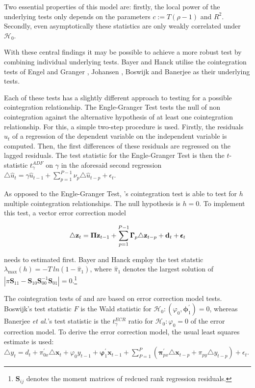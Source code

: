 \documentclass[11pt,a4paper]{article}
\let\rmarkdownfootnote\footnote%
\def\footnote{\protect\rmarkdownfootnote}
\begin{document}
Two essential properties of this model are: firstly, the local power of
the underlying tests only depends on the parameters \(c := T(\rho -1)\)
and \(R^2\). Secondly, even asymptotically these statistics are only
weakly correlated under \(\mathcal{H}_0\). \autocite{gregory_mixed_2004}

With these central findings it may be possible to achieve a more robust
test by combining individual underlying tests. Bayer and Hanck utilise
the cointegration tests of Engel and Granger
\autocite{Englegranger1987}, Johansen \autocite{Johansen1988}, Boswijk
\autocite{Boswijk1994} and Banerjee \autocite{Banerjee1998} as their
underlying tests.

Each of these tests has a slightly different approach to testing for a
possible cointegration relationship. The Engle-Granger Test tests the
null of non cointegration against the alternative hypothesis of at least
one cointegration relationship. For this, a simple two-step procedure is
used. Firstly, the residuals \(\hat{u}_t\) of a regression of the
dependent variable on the independent variable is computed. Then, the
first differences of these residuals are regressed on the lagged
residuals. The test statistic for the Engle-Granger Test is then the
\(t\)-statistic \(t^{ADF}_\gamma\) on \(\gamma\) in the aforesaid second
regression
\(\triangle \hat{u}_t = \gamma \hat{u}_{t-1} + \sum_{p = 1}^{P-1}\nu_p \triangle \hat{u}_{t-p} +\epsilon_t\).
\autocite{Englegranger1987}

As opposed to the Engle-Granger Test, \textcite{Johansen1988}'s
cointegration test is able to test for \(h\) multiple cointegration
relationships. The null hypothesis is \(h = 0\). To implement this test,
a vector error correction model

\begin{align}
\triangle {\bf z}_t = {\bf \Pi z}_{t-1} + \sum^{P-1}_{p=1}\pmb{\Gamma}_p \triangle{\bf z}_{t-p} + {\bf d}_t + \pmb{\epsilon}_t
\end{align}

needs to estimated first. Bayer and Hanck employ the test statstic
\(\lambda_{\max} (h) = - T \ ln(1 - \hat{\pi}_1)\), where
\(\hat{\pi}_1\) denotes the largest solution of
\(|\pi \pmb{S}_{11} - \pmb{S}_{10} \pmb{S}_{00}^{-1} \pmb{S}_{01}|= 0\).\footnote{\(\pmb{S}_{ij}\)
  denotes the moment matrices of redcued rank regression residuals.}

The cointegration tests of \textcite{Boswijk1994} and
\textcite{Banerjee1998} are based on error correction model tests.
Boswijk's test statistic \(\hat{F}\) is the Wald statistic for
\(\mathcal{H}_0: (\varphi_0, \pmb{\phi}_1^{'}) = 0\), whereas Banerjee
\emph{et al.}'s test statistic is the \(t_{\gamma}^{ECR}\) ratio for
\(\mathcal{H}_0 : \varphi_0 = 0\) of the error correction model. To
derive the error correction model, the usual least squares estimate is
used:
\(\triangle y_t = d_t + \pi_{0x}^{'} \triangle \pmb{x}_t + \varphi_0 y_{t-1} + \pmb{\varphi}_{1}^{'} \pmb{x}_{t-1} + \sum_{P = 1}^{P} \left( \pmb{\pi}_{px}^{'} \triangle \pmb{x}_{t-p} + \pi_{py} \triangle y_{t - p} \right) + \epsilon_t\).
\end{document}
